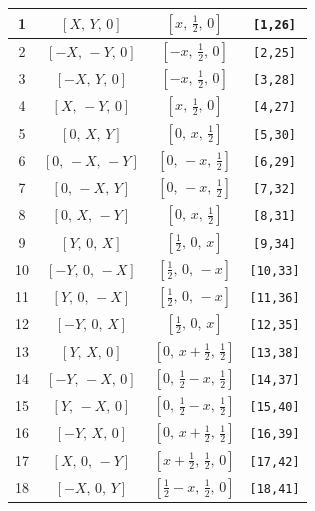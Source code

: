 \documentclass[fleqn,8pt]{jsarticle}
\begin{document}
\begin{longtable}{cccc}
1 & $\left[ X,\, Y,\, 0 \right]$ & $\left[ x,\, \frac{1}{2},\, 0 \right]$ & {\tt [1,26]} \\ \hline
2 & $\left[ - X,\, - Y,\, 0 \right]$ & $\left[ - x,\, \frac{1}{2},\, 0 \right]$ & {\tt [2,25]} \\ \hline
3 & $\left[ - X,\, Y,\, 0 \right]$ & $\left[ - x,\, \frac{1}{2},\, 0 \right]$ & {\tt [3,28]} \\ \hline
4 & $\left[ X,\, - Y,\, 0 \right]$ & $\left[ x,\, \frac{1}{2},\, 0 \right]$ & {\tt [4,27]} \\ \hline
5 & $\left[ 0,\, X,\, Y \right]$ & $\left[ 0,\, x,\, \frac{1}{2} \right]$ & {\tt [5,30]} \\ \hline
6 & $\left[ 0,\, - X,\, - Y \right]$ & $\left[ 0,\, - x,\, \frac{1}{2} \right]$ & {\tt [6,29]} \\ \hline
7 & $\left[ 0,\, - X,\, Y \right]$ & $\left[ 0,\, - x,\, \frac{1}{2} \right]$ & {\tt [7,32]} \\ \hline
8 & $\left[ 0,\, X,\, - Y \right]$ & $\left[ 0,\, x,\, \frac{1}{2} \right]$ & {\tt [8,31]} \\ \hline
9 & $\left[ Y,\, 0,\, X \right]$ & $\left[ \frac{1}{2},\, 0,\, x \right]$ & {\tt [9,34]} \\ \hline
10 & $\left[ - Y,\, 0,\, - X \right]$ & $\left[ \frac{1}{2},\, 0,\, - x \right]$ & {\tt [10,33]} \\ \hline
11 & $\left[ Y,\, 0,\, - X \right]$ & $\left[ \frac{1}{2},\, 0,\, - x \right]$ & {\tt [11,36]} \\ \hline
12 & $\left[ - Y,\, 0,\, X \right]$ & $\left[ \frac{1}{2},\, 0,\, x \right]$ & {\tt [12,35]} \\ \hline
13 & $\left[ Y,\, X,\, 0 \right]$ & $\left[ 0,\, x + \frac{1}{2},\, \frac{1}{2} \right]$ & {\tt [13,38]} \\ \hline
14 & $\left[ - Y,\, - X,\, 0 \right]$ & $\left[ 0,\, \frac{1}{2} - x,\, \frac{1}{2} \right]$ & {\tt [14,37]} \\ \hline
15 & $\left[ Y,\, - X,\, 0 \right]$ & $\left[ 0,\, \frac{1}{2} - x,\, \frac{1}{2} \right]$ & {\tt [15,40]} \\ \hline
16 & $\left[ - Y,\, X,\, 0 \right]$ & $\left[ 0,\, x + \frac{1}{2},\, \frac{1}{2} \right]$ & {\tt [16,39]} \\ \hline
17 & $\left[ X,\, 0,\, - Y \right]$ & $\left[ x + \frac{1}{2},\, \frac{1}{2},\, 0 \right]$ & {\tt [17,42]} \\ \hline
18 & $\left[ - X,\, 0,\, Y \right]$ & $\left[ \frac{1}{2} - x,\, \frac{1}{2},\, 0 \right]$ & {\tt [18,41]} \\ \hline

\end{longtable}
\end{document}
